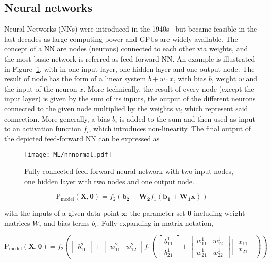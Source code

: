 \subsection{Neural networks}
\label{ML:SectionNN}
Neural Networks (NNs) were introduced in the 1940s~\cite{McCulloch1943} but became feasible in the last decades as large computing power and GPUs are widely available. The concept of a NN are nodes (neurons) connected to each other via weights, and the most basic network is referred as feed-forward NN. An example is illustrated in Figure~\ref{ML:normalNN}, with in one input layer, one hidden layer and one output node. The result of node has the form of a linear system $b+w\cdot x$, with bias $b$, weight $w$ and the input of the neuron $x$. More technically, the result of every node (except the input layer) is given by the sum of its inputs, the output of the different neurons connected to the given node multiplied by the weights $w_i$ which represent said connection. More generally, a bias $b_i$ is added to the sum and then used as input to an activation function $f_i$, which introduces non-linearity. The final output of the depicted feed-forward NN can be expressed as

\begin{figure}[htbp]
    \RawFloats
    \begin{center}
    \texttt{[image: ML/nnnormal.pdf]}
    \caption{
        Fully connected feed-forward neural network with two input nodes, one hidden layer with two nodes and one output node.
    }
    \label{ML:normalNN}
    \end{center}
\end{figure}

\begin{equation}
    \text{P}_\text{model}(\mathbf{X},\boldsymbol{\theta}) = f_2(\mathbf{b_2}+\mathbf{W_2}f_1(\mathbf{b_1}+\mathbf{W_1}\mathbf{x}))
\end{equation}

with the inputs of a given data-point $\mathbf{x}$; the parameter set $\boldsymbol{\theta}$ including weight matrices $W_i$ and bias terms $b_i$. Fully expanding in matrix notation,

\begin{equation}
    \text{P}_\text{model}(\mathbf{X},\boldsymbol{\theta}) = f_2\left( \begin{bmatrix} b_{11}^2 \end{bmatrix}+ \begin{bmatrix} w_{11}^2 & w_{12}^2\end{bmatrix}f_1\left( \begin{bmatrix} b_{11}^1 \\  
                                                            b_{21}^1  \end{bmatrix}+ \begin{bmatrix} 
    w_{11}^1 & w_{12}^1 \\ 
    w_{21}^1 & w_{22}^1\end{bmatrix} \begin{bmatrix}
        x_{11}\\
        x_{21}
    \end{bmatrix} \right) \right)
\end{equation}

